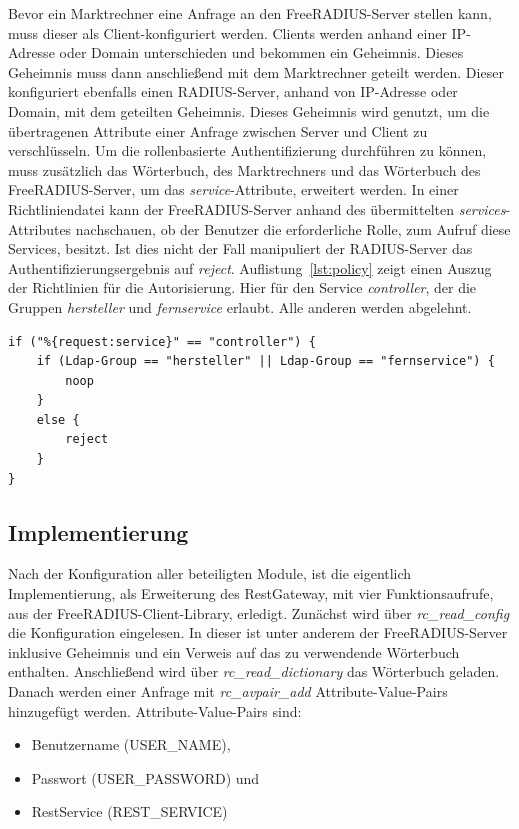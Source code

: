 \documentclass[11pt,a4paper]{report}
\begin{document}
Bevor ein Marktrechner eine Anfrage an den FreeRADIUS-Server stellen kann, muss dieser als Client-konfiguriert werden. Clients werden anhand einer IP-Adresse oder Domain unterschieden und bekommen ein Geheimnis. Dieses Geheimnis muss dann anschließend mit dem Marktrechner geteilt werden. Dieser konfiguriert ebenfalls einen RADIUS-Server, anhand von IP-Adresse oder Domain, mit dem geteilten Geheimnis. Dieses Geheimnis wird genutzt, um die übertragenen Attribute einer Anfrage zwischen Server und Client zu verschlüsseln. Um die rollenbasierte Authentifizierung durchführen zu können, muss zusätzlich das Wörterbuch, des Marktrechners und das Wörterbuch des FreeRADIUS-Server, um das \textit{service}-Attribute, erweitert werden. In einer Richtliniendatei kann der FreeRADIUS-Server anhand des übermittelten \textit{services}-Attributes nachschauen, ob der Benutzer die erforderliche Rolle, zum Aufruf diese Services, besitzt. Ist dies nicht der Fall manipuliert der RADIUS-Server das Authentifizierungsergebnis auf \textit{reject}. Auflistung~\ref{lst:policy} zeigt einen Auszug der Richtlinien für die Autorisierung. Hier für den Service \textit{controller}, der die Gruppen \textit{hersteller} und \textit{fernservice} erlaubt. Alle anderen werden abgelehnt.

\begin{lstlisting}[caption=Richtlinie für den controller-Service, label=lst:policy]
if ("%{request:service}" == "controller") {
    if (Ldap-Group == "hersteller" || Ldap-Group == "fernservice") {
        noop
    }
    else {
        reject
    }
}
\end{lstlisting}

\subsection{Implementierung}

Nach der Konfiguration aller beteiligten Module, ist die eigentlich Implementierung, als Erweiterung des RestGateway, mit vier Funktionsaufrufe, aus der FreeRADIUS-Client-Library, erledigt. Zunächst wird über \textit{rc\_read\_config} die Konfiguration eingelesen. In dieser ist unter anderem der FreeRADIUS-Server inklusive Geheimnis und ein Verweis auf das zu verwendende Wörterbuch enthalten. Anschließend wird über \textit{rc\_read\_dictionary} das Wörterbuch geladen. Danach werden einer Anfrage mit \textit{rc\_avpair\_add} Attribute-Value-Pairs hinzugefügt werden. Attribute-Value-Pairs sind:

\begin{itemize}
\item Benutzername (USER\_NAME),
\item Passwort (USER\_PASSWORD) und
\item RestService (REST\_SERVICE)
\end{itemize}
\end{document}
